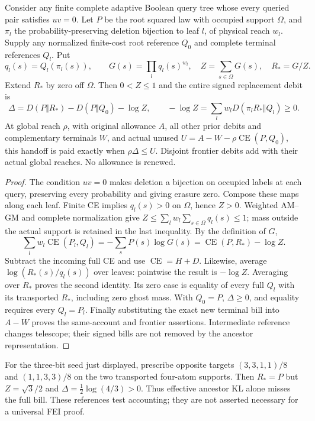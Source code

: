 \begin{theorem}\label{thm:v10geo}
Consider any finite complete adaptive Boolean query tree whose every
queried pair satisfies $uv=0$. Let $P$ be the root squared law with
occupied support $\Omega$, and $\pi_l$ the probability-preserving
deletion bijection to leaf $l$, of physical reach $w_l$. Supply any
normalized finite-cost root reference $Q_0$ and complete terminal
references $Q_l$. Put
\[
 q_l(s)=Q_l(\pi_l(s)),\qquad
 G(s)=\prod_lq_l(s)^{w_l},\quad Z=\sum_{s\in\Omega}G(s),\quad R_*=G/Z.
\]
Extend $R_*$ by zero off $\Omega$. Then $0<Z\le1$ and the entire signed
replacement debit is
\[
 \Delta=D(P\Vert R_*)-D(P\Vert Q_0)-\log Z,
 \qquad -\log Z=\sum_l w_lD(\pi_lR_*\Vert Q_l)\ge0.
\]
At global reach $\rho$, with original allowance $A$, all other prior
debits and complementary terminals $W$, and actual unused
$U=A-W-\rho\operatorname{CE}(P,Q_0)$, this handoff is paid exactly when
$\rho\Delta\le U$. Disjoint frontier debits add with their actual
global reaches. No allowance is renewed.
\end{theorem}
\begin{proof}
The condition $uv=0$ makes deletion a bijection on occupied labels at
each query, preserving every probability and giving erasure zero.
Compose these maps along each leaf. Finite CE implies $q_l(s)>0$ on
$\Omega$, hence $Z>0$. Weighted AM--GM and complete normalization give
$Z\le\sum_lw_l\sum_{s\in\Omega}q_l(s)\le1$; mass outside the actual
support is retained in the last inequality. By the definition of $G$,
\[
 \sum_lw_l\operatorname{CE}(P_l,Q_l)
 =-\sum_sP(s)\log G(s)=\operatorname{CE}(P,R_*)-\log Z.
\]
Subtract the incoming full CE and use $\operatorname{CE}=H+D$.
Likewise, average $\log(R_*(s)/q_l(s))$ over leaves: pointwise the result
is $-\log Z$. Averaging over $R_*$ proves the second identity. Its zero
case is equality of every full $Q_l$ with its transported $R_*$,
including zero ghost mass. With $Q_0=P$, $\Delta\ge0$, and equality
requires every $Q_l=P_l$. Finally substituting the exact new terminal
bill into $A-W$ proves the same-account and frontier assertions.
Intermediate reference changes telescope; their signed bills are not
removed by the ancestor representation.
\end{proof}

For the three-bit seed just displayed, prescribe opposite targets
$(3,3,1,1)/8$ and $(1,1,3,3)/8$ on the two transported four-atom
supports. Then $R_*=P$ but $Z=\sqrt3/2$ and
$\Delta=\frac12\log(4/3)>0$. Thus effective ancestor KL alone misses
the full bill. These references test accounting; they are not asserted
necessary for a universal FEI proof.

